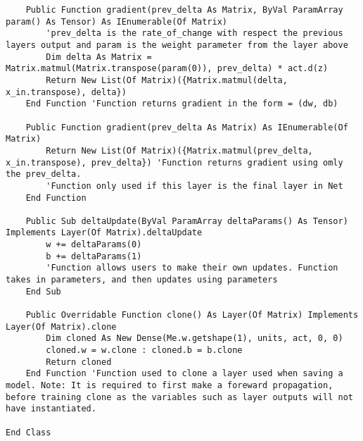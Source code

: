 \begin{verbatim}
    Public Function gradient(prev_delta As Matrix, ByVal ParamArray param() As Tensor) As IEnumerable(Of Matrix)
        'prev_delta is the rate_of_change with respect the previous layers output and param is the weight parameter from the layer above
        Dim delta As Matrix = Matrix.matmul(Matrix.transpose(param(0)), prev_delta) * act.d(z)
        Return New List(Of Matrix)({Matrix.matmul(delta, x_in.transpose), delta})
    End Function 'Function returns gradient in the form = (dw, db)

    Public Function gradient(prev_delta As Matrix) As IEnumerable(Of Matrix)
        Return New List(Of Matrix)({Matrix.matmul(prev_delta, x_in.transpose), prev_delta}) 'Function returns gradient using omly the prev_delta.
        'Function only used if this layer is the final layer in Net
    End Function

    Public Sub deltaUpdate(ByVal ParamArray deltaParams() As Tensor) Implements Layer(Of Matrix).deltaUpdate
        w += deltaParams(0)
        b += deltaParams(1)
        'Function allows users to make their own updates. Function takes in parameters, and then updates using parameters
    End Sub

    Public Overridable Function clone() As Layer(Of Matrix) Implements Layer(Of Matrix).clone
        Dim cloned As New Dense(Me.w.getshape(1), units, act, 0, 0)
        cloned.w = w.clone : cloned.b = b.clone
        Return cloned
    End Function 'Function used to clone a layer used when saving a model. Note: It is required to first make a foreward propagation, before training clone as the variables such as layer outputs will not have instantiated. 

End Class
\end{verbatim}